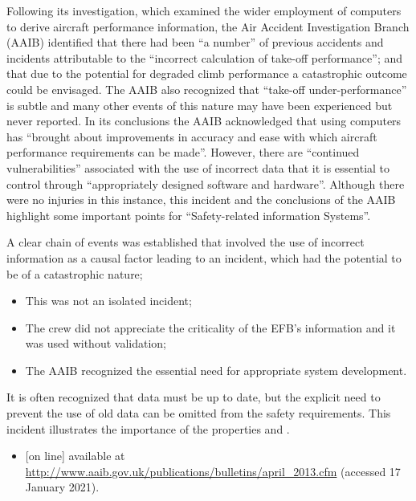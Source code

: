 Following its investigation, which examined the wider employment of computers to derive aircraft performance \gls{information}, the Air Accident Investigation Branch (AAIB) identified that there had been ``a number'' of previous accidents and incidents attributable to the ``incorrect calculation of take-off performance''; and that due to the potential for degraded climb performance a catastrophic outcome could be envisaged. The AAIB also recognized that ``take-off under-performance'' is subtle and many other events of this nature may have been experienced but never reported. In its conclusions the AAIB acknowledged that using computers has ``brought about improvements in \gls{accuracy} and ease with which aircraft performance requirements can be made''. However, there are ``continued vulnerabilities'' associated with the use of incorrect data that it is essential to control through ``appropriately designed software and hardware''. Although there were no injuries in this instance, this incident and the conclusions of the AAIB highlight some important points for ``Safety-related \Gls{information} Systems''.

A clear chain of events was established that involved the use of incorrect \gls{information} as a causal factor leading to an incident, which had the potential to be of a catastrophic nature;
\begin{itemize}
\item This was not an isolated incident;
\item The crew did not appreciate the \gls{criticality} of the EFB’s \gls{information} and it was used without validation; 
\item The AAIB recognized the essential need for appropriate system development. 
\end{itemize}

It is often recognized that data must be up to date, but the explicit need to prevent the use of old data can be omitted from the safety requirements. This incident illustrates the importance of the properties  and . 

    
\begin{itemize}
\item \raggedright{ [on line] available at \href{http://www.aaib.gov.uk/publications/bulletins/april_2013.cfm}{http://www.aaib.gov.uk/publications/bulletins/april\_2013.cfm} (accessed 17 January 2021).}
\end{itemize}
    
